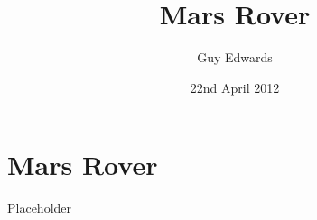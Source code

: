 \documentclass[11pt]{book}
\author{Guy Edwards}
\date{22nd April 2012}
\title{Mars Rover}
\begin{document}

\chapter{Mars Rover}

Placeholder

\paragraph{}

\clearpage
\end{document}
